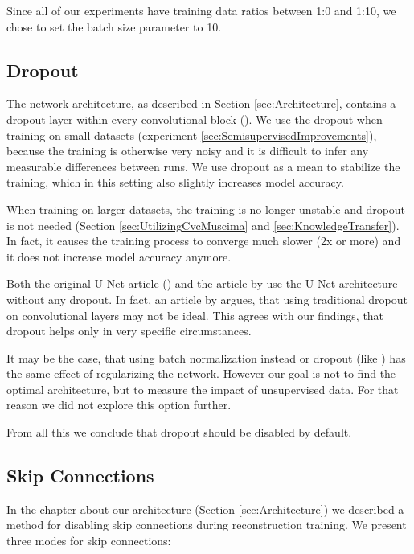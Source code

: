 Since all of our experiments have training data ratios between 1:0 and 1:10, we chose to set the batch size parameter to 10.


\subsection{Dropout}
\label{sec:Dropout}

The network architecture, as described in Section \ref{sec:Architecture}, contains a dropout layer within every convolutional block (\cite{Dropout}). We use the dropout when training on small datasets (experiment \ref{sec:SemisupervisedImprovements}), because the training is otherwise very noisy and it is difficult to infer any measurable differences between runs. We use dropout as a mean to stabilize the training, which in this setting also slightly increases model accuracy.

When training on larger datasets, the training is no longer unstable and dropout is not needed (Section \ref{sec:UtilizingCvcMuscima} and \ref{sec:KnowledgeTransfer}). In fact, it causes the training process to converge much slower (2x or more) and it does not increase model accuracy anymore.

Both the original U-Net article (\cite{UNet}) and the article by \cite{HajicEtAl} use the U-Net architecture without any dropout. In fact, an article by \cite{DropoutOnConvolutions} argues, that using traditional dropout on convolutional layers may not be ideal. This agrees with our findings, that dropout helps only in very specific circumstances.

It may be the case, that using batch normalization instead or dropout (like \cite{HajicEtAl}) has the same effect of regularizing the network. However our goal is not to find the optimal architecture, but to measure the impact of unsupervised data. For that reason we did not explore this option further.

From all this we conclude that dropout should be disabled by default.


\subsection{Skip Connections}
\label{sec:SkipConnections}

In the chapter about our architecture (Section \ref{sec:Architecture}) we described a method for disabling skip connections during reconstruction training. We present three modes for skip connections:

